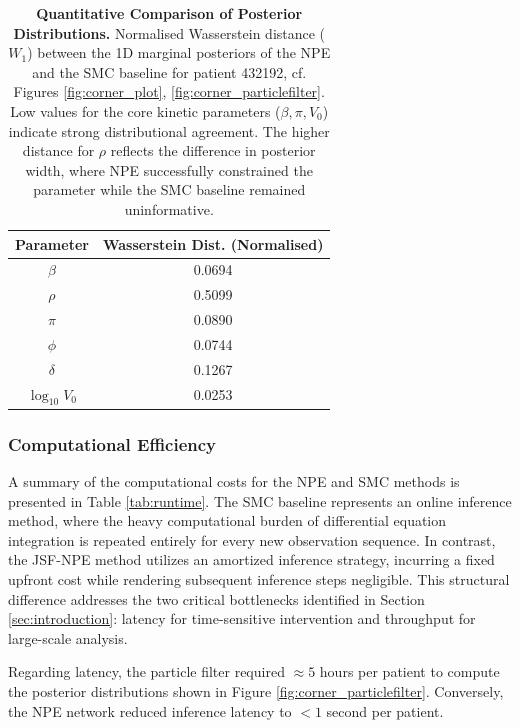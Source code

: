 \documentclass{article}
\begin{document}
\begin{table}[htbp]
\centering
\caption{\textbf{Quantitative Comparison of Posterior Distributions.} Normalised Wasserstein distance ($W_1$) between the 1D marginal posteriors of the NPE and the SMC baseline for patient 432192, cf. Figures \ref{fig:corner_plot}, \ref{fig:corner_particlefilter}. Low values for the core kinetic parameters ($\beta, \pi, V_0$) indicate strong distributional agreement. The higher distance for $\rho$ reflects the difference in posterior width, where NPE successfully constrained the parameter while the SMC baseline remained uninformative.}
\begin{tabular}{c c}
\toprule
\textbf{Parameter} & \textbf{Wasserstein Dist. (Normalised)} \\
\midrule
$\beta$       & 0.0694 \\
$\rho$         & 0.5099 \\
$\pi$       & 0.0890 \\
$\phi$            & 0.0744 \\
$\delta$      & 0.1267 \\
$\log_{10}V_0$  & 0.0253 \\
\bottomrule
\end{tabular}
\label{tab:wasserstein_scores}
\end{table}



\subsubsection{Computational Efficiency}\label{sec:computation_time}

A summary of the computational costs for the NPE and SMC methods is presented in Table \ref{tab:runtime}. The SMC baseline represents an online inference method, where the heavy computational burden of differential equation integration is repeated entirely for every new observation sequence. In contrast, the JSF-NPE method utilizes an amortized inference strategy, incurring a fixed upfront cost while rendering subsequent inference steps negligible. This structural difference addresses the two critical bottlenecks identified in Section \ref{sec:introduction}: latency for time-sensitive intervention and throughput for large-scale analysis.

Regarding latency, the particle filter required $\approx 5$ hours per patient to compute the posterior distributions shown in Figure \ref{fig:corner_particlefilter}. Conversely, the NPE network reduced inference latency to $< 1$ second per patient.
\end{document}
